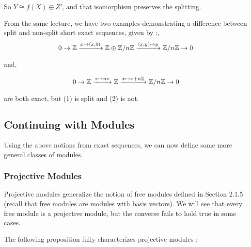 \documentclass[11pt, reqno]{amsart}
\theoremstyle{plain}
\theoremstyle{definition}
\theoremstyle{example}
\begin{document}
So $Y \cong f(X) \oplus Z'$, and that isomorphism preserves the splitting.

\par
From the same lecture, we have two examples demonstrating a difference between split and non-split short exact sequences, given by \cite[Lec 10, p.7]{dau}:,
\begin{align}
0 \rightarrow \mathbb{Z} \xrightarrow{x \mapsto (x,0)} \mathbb{Z} \oplus \mathbb{Z}/n\mathbb{Z} \xrightarrow{(x,y) \mapsto y} \mathbb{Z}/n\mathbb{Z} \rightarrow 0
\end{align}

and,

\begin{align}
0 \rightarrow \mathbb{Z} \xrightarrow{x \mapsto nz} \mathbb{Z} \xrightarrow{x \mapsto x + n\mathbb{Z}} \mathbb{Z}/n\mathbb{Z} \rightarrow 0
\end{align}

are both exact, but (1) is split and (2) is not.


\subsection{Continuing with Modules}

Using the above notions from exact sequences, we can now define some more general classes of modules.

\subsubsection{Projective Modules}

Projective modules generalize the notion of free modules defined in Section 2.1.5 (recall that free modules are modules with basis vectors). We will see that every free module is a projective module, but the converse fails to hold true in some cases.

\par
The following proposition fully characterizes projective modules \cite[\S 10.5, p. 389]{dummit}:
\end{document}
